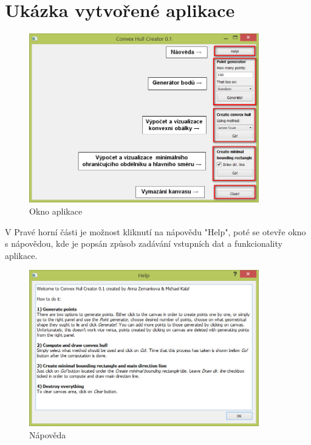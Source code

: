\documentclass[a4paper, 12pt]{article}
\begin{document}

\clearpage
\section{Ukázka vytvořené aplikace}
\begin{figure}[h!]
	\centering
	\includegraphics[width=10cm]{popis.jpg}
	\caption{Okno aplikace}
\end{figure}

V Pravé horní části je možnost kliknutí na nápovědu "Help", poté se otevře okno s nápovědou, 
kde je popsán způsob zadávání vstupních dat a funkcionality aplikace.\\

\begin{figure}[h!]
	\centering
	\includegraphics[width=10cm]{help.jpg}
	\caption{Nápověda}
\end{figure}

\clearpage
\end{document}
